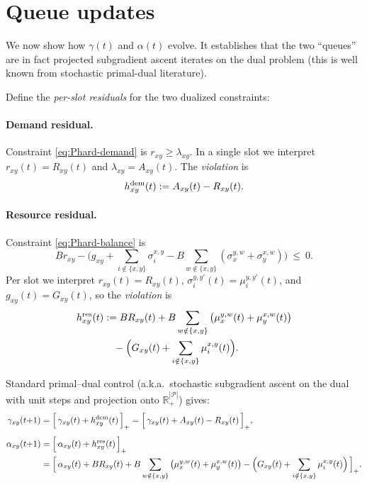 \documentclass[11pt]{article}
\newcommand{\Pairs}{\mathcal{P}} %
\begin{document}
\section{Queue updates}

We now show how $\gamma(t)$ and $\alpha(t)$ evolve. It establishes that the two “queues” are in fact projected subgradient ascent iterates on the dual problem (this is well known from stochastic primal-dual literature). 

Define the \emph{per-slot residuals} for the two dualized constraints:

\paragraph{Demand residual.}
Constraint \eqref{eq:Phard-demand} is $r_{xy} \ge \lambda_{xy}$.
In a single slot we interpret $r_{xy}(t)=R_{xy}(t)$ and $\lambda_{xy}=A_{xy}(t)$. The \emph{violation} is
\[
h^{\rm dem}_{xy}(t) := A_{xy}(t)-R_{xy}(t).
\]

\paragraph{Resource residual.}
Constraint \eqref{eq:Phard-balance} is
\[
B r_{xy} - 
\Big(
g_{xy}
+\sum_{i\notin\{x,y\}}\sigma_i^{x,y}
- B\sum_{w\notin\{x,y\}}(\sigma_x^{y,w}+\sigma_y^{x,w})
\Big)
\ \le\ 0.
\]
Per slot we interpret $r_{xy}(t)=R_{xy}(t)$, $\sigma_i^{y,y'}(t)=\mu_i^{y,y'}(t)$, and $g_{xy}(t)=G_{xy}(t)$, so the \emph{violation} is
\begin{equation}
\begin{aligned}
h^{\rm res}_{xy}(t)
&:= B R_{xy}(t)
+ B\sum_{w\notin\{x,y\}}\big(\mu_x^{y,w}(t)+\mu_y^{x,w}(t)\big)\\
&\quad
- \Big(
G_{xy}(t)
+\sum_{i\notin\{x,y\}}\mu_i^{x,y}(t)
\Big).
\end{aligned}
\label{eq:hres-expand}
\end{equation}

Standard primal--dual control (a.k.a.\ stochastic subgradient ascent on the dual with
unit steps and projection onto $\mathbb{R}_+^{|\Pairs|}$) gives:
\begin{align}
\gamma_{xy}(t{+}1)
&=\Big[\,
\gamma_{xy}(t)+h^{\rm dem}_{xy}(t)
\,\Big]_+
=\Big[\,
\gamma_{xy}(t)+A_{xy}(t)-R_{xy}(t)
\,\Big]_+,
\label{eq:gamma-update-full}\\[4pt]
\alpha_{xy}(t{+}1)
&=\Big[\,
\alpha_{xy}(t)+h^{\rm res}_{xy}(t)
\,\Big]_+\nonumber\\
&=\Big[\,
\alpha_{xy}(t)
+ B R_{xy}(t)
+ B\sum_{w\notin\{x,y\}}\big(\mu_x^{y,w}(t)+\mu_y^{x,w}(t)\big)
- \Big(
G_{xy}(t)
+\sum_{i\notin\{x,y\}}\mu_i^{x,y}(t)
\Big)
\,\Big]_+.
\label{eq:alphares-update-full}
\end{align}
\end{document}
